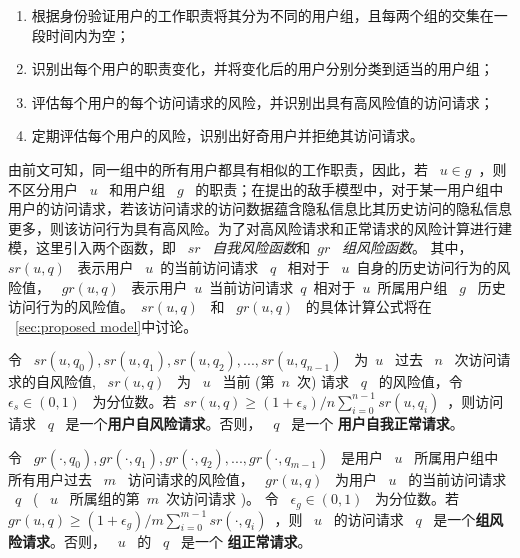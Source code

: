 \begin{enumerate}
	\item 根据身份验证用户的工作职责将其分为不同的用户组，且每两个组的交集在一段时间内为空；
	\item 识别出每个用户的职责变化，并将变化后的用户分别分类到适当的用户组；
	\item 评估每个用户的每个访问请求的风险，并识别出具有高风险值的访问请求；
	\item 定期评估每个用户的风险，识别出好奇用户并拒绝其访问请求。
\end{enumerate}

由前文可知，同一组中的所有用户都具有相似的工作职责，因此，若 ~$u \in g$~，则不区分用户 ~$u$~ 和用户组 ~$g$~ 的职责；在提出的敌手模型中，对于某一用户组中用户的访问请求，若该访问请求的访问数据蕴含隐私信息比其历史访问的隐私信息更多，则该访问行为具有高风险。为了对高风险请求和正常请求的风险计算进行建模，这里引入两个函数，即 ~$sr$~ \emph{自我风险函数}和~$gr$~ \emph{组风险函数}。 其中，~$sr(u,q)$~ 表示用户 ~$u$~的当前访问请求 ~$q$~ 相对于 ~$u$~自身的历史访问行为的风险值， ~$gr(u,q)$~ 表示用户~$u$~当前访问请求~$q$~相对于~$u$~所属用户组 ~$g$~ 历史访问行为的风险值。~$sr(u,q)$~ 和 ~$gr(u,q)$~ 的具体计算公式将在 ~\ref{sec:proposed model}中讨论。

\begin{definition}%
	\label{def_self_risky}
	令 ~$sr(u, q_0), sr(u, q_1), sr(u, q_2), ... ,sr(u, q_{n-1})$~ 为~$u$~ 过去 ~$n$~ 次访问请求的自风险值, ~$sr(u,q)$~ 为 ~$u$~ 当前 (第~$n$~次) 请求 ~$q$~ 的风险值，令 ~$\epsilon_s \in (0,1)$~ 为分位数。若~$sr(u,q) \geq  (1+\epsilon_s) / n  \sum ^{n-1}_{i=0}{sr(u,q_i)}$~，则访问请求 ~$q$~ 是一个\textbf{用户自风险请求}。否则， ~$q$~ 是一个 \textbf{用户自我正常请求}。
\end{definition}

\begin{definition}%
	\label{def_group_risky}
	令 ~$gr(\cdot, q_0), gr(\cdot, q_1), gr(\cdot, q_2), ... , gr(\cdot, q_{m-1})$~ 是用户 ~$u$~ 所属用户组中所有用户过去 ~$m$~ 访问请求的风险值， ~$gr(u,q)$~ 为用户 ~$u$~ 的当前访问请求 ~$q$~  ( ~$u$~ 所属组的第~$m$~次访问请求 )。 令 ~$\epsilon_g \in (0,1)$~ 为分位数。若~$gr(u,q) \geq  (1+\epsilon_g) / m  \sum ^{m-1}_{i=0}{sr(\cdot,q_i)}$~，则 ~$u$~ 的访问请求 ~$q$~ 是一个\textbf{组风险请求}。否则， ~$u$~ 的 ~$q$~ 是一个 \textbf{组正常请求}。
\end{definition}



